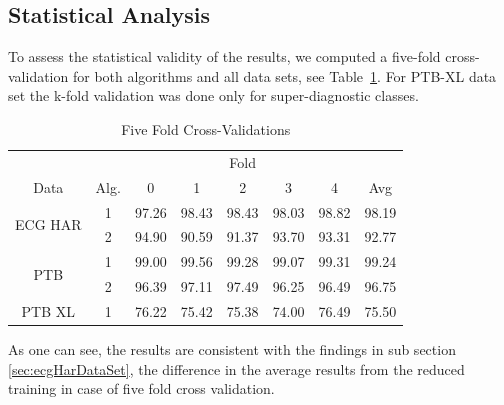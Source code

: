 \documentclass{ieeeaccess}
\begin{document}
\subsection{Statistical Analysis}
To assess the statistical validity of the results, we computed a five-fold cross-validation for both algorithms and all data sets, see Table~\ref{tbl:fiveFoldValidation}. For PTB-XL data set the k-fold validation was done only for super-diagnostic classes.
 
\begin{table}[!ht]
\centering
\caption{Five Fold Cross-Validations}
\label{tbl:fiveFoldValidation}
\renewcommand{\arraystretch}{1.2}
\begin{tabular}{c|c|c|c|c|c|c|c}
					&					&\multicolumn{5}{c|}{Fold}&\\
Data	            &Alg.   &0      &1      &2      &3      &4      & Avg\\ \hline
\multirow{2}{*}{ECG HAR}	&1   	&97.26 &98.43 &98.43 &98.03 &98.82 &98.19 \\\cline{2-8}	%
					&2   	&94.90 &90.59 &91.37 &93.70 &93.31 &92.77 \\\hline	        %
\multirow{2}{*}{PTB}&1   	&99.00 &99.56 &99.28 &99.07 &99.31 &99.24 \\\cline{2-8}	    %
				   	&2	    &96.39 &97.11 &97.49 &96.25 &96.49 &96.75 \\\hline	        %
PTB XL				&1	    &76.22  &75.42  &75.38  &74.00  &76.49  &75.50 \\		        %

\end{tabular}
\end{table}


As one can see, the results are consistent with the findings in sub section \ref{sec:ecgHarDataSet}, the difference in the average results from the reduced training in case of five fold cross validation. 
\end{document}
